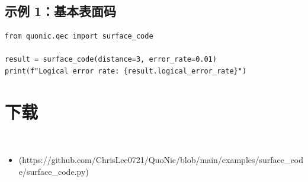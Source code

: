 \documentclass[12pt,a4paper]{article}
\begin{document}
\subsection{示例 1：基本表面码}

\begin{lstlisting}[style=python]
from quonic.qec import surface_code

result = surface_code(distance=3, error_rate=0.01)
print(f"Logical error rate: {result.logical_error_rate}")
\end{lstlisting}


\section{下载}

\begin{itemize}
  \item [surface_code.py](https://github.com/ChrisLee0721/QuoNic/blob/main/examples/surface_code/surface_code.py)
\end{itemize}
\end{document}
